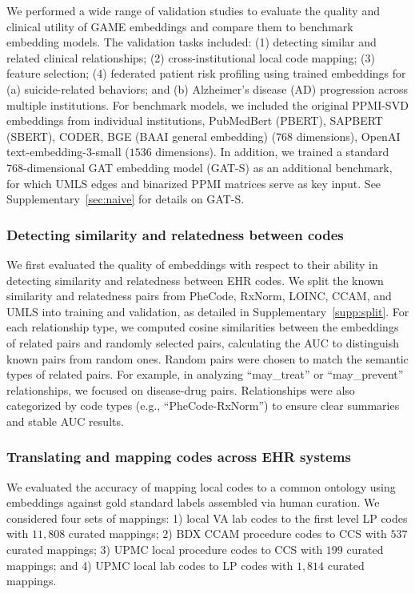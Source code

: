 \documentclass{article}
\begin{document}
We performed a wide range of validation studies to evaluate the quality and clinical utility of GAME embeddings and compare them to benchmark embedding models. The validation tasks included: (1) detecting similar and related clinical relationships; (2) cross-institutional local code mapping; (3) feature selection;  (4) federated patient risk profiling using trained embeddings for (a) suicide-related behaviors; and (b) Alzheimer’s disease (AD) progression across multiple institutions. For benchmark models, we included the original PPMI-SVD embeddings from individual institutions, PubMedBert (PBERT), SAPBERT (SBERT), CODER, BGE (BAAI general embedding) ($768$ dimensions), OpenAI text-embedding-3-small ($1536$ dimensions). In addition, we trained a standard $768$-dimensional GAT embedding model (GAT-S) \cite{lee2020harmonized} as an additional benchmark, for which UMLS edges and binarized PPMI matrices serve as key input. See Supplementary~\ref{sec:naive} for details on GAT-S.


\subsubsection{Detecting similarity and relatedness between codes}

We first evaluated the quality of embeddings with respect to their ability in detecting similarity and relatedness between EHR codes. We split the known similarity and relatedness pairs from PheCode, RxNorm, LOINC, CCAM, and UMLS into training and validation, as detailed in Supplementary~\ref{supp:split}. For each relationship type, we computed cosine similarities between the embeddings of related pairs and randomly selected pairs, calculating the AUC to distinguish known pairs from random ones. Random pairs were chosen to match the semantic types of related pairs. For example, in analyzing ``may\_treat'' or ``may\_prevent'' relationships, we focused on disease-drug pairs. Relationships were also categorized by code types (e.g., ``PheCode-RxNorm'') to ensure clear summaries and stable AUC results.

\subsubsection{Translating and mapping codes across EHR systems}
\label{sec:code_map}

We evaluated the accuracy of mapping local codes to a common ontology using embeddings against gold standard labels assembled via human curation. We considered four sets of mappings: 1) local VA lab codes to the first level LP codes with $11,808$ curated mappings; 2) BDX CCAM procedure codes to CCS with $537$ curated mappings; 3) UPMC local procedure codes to CCS with $199$ curated mappings; and 4) UPMC local lab codes to LP codes with $1,814$ curated mappings. 
\end{document}
